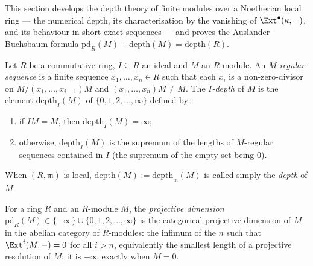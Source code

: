 This section develops the depth theory of finite modules over a Noetherian local ring
--- the numerical depth, its characterisation by the vanishing of
\(\Ext^{\bullet}(\kappa, -)\), and its behaviour in short exact sequences --- and proves
the Auslander--Buchsbaum formula
\(\mathrm{pd}_R(M) + \mathrm{depth}(M) = \mathrm{depth}(R)\).

\begin{definition}
  \label{def:depth}
  \leanok
  Let \(R\) be a commutative ring, \(I \subseteq R\) an ideal and \(M\) an \(R\)-module.
  An \emph{\(M\)-regular sequence} is a finite sequence \(x_1, \dots, x_n \in R\) such
  that each \(x_i\) is a non-zero-divisor on \(M/(x_1, \dots, x_{i-1})M\) and
  \((x_1, \dots, x_n)M \neq M\). The \emph{\(I\)-depth} of \(M\) is the element
  \(\mathrm{depth}_I(M)\) of \(\{0, 1, 2, \dots, \infty\}\) defined by:
  \begin{enumerate}
    \item if \(IM = M\), then \(\mathrm{depth}_I(M) = \infty\);
    \item otherwise, \(\mathrm{depth}_I(M)\) is the supremum of the lengths of
      \(M\)-regular sequences contained in \(I\) (the supremum of the empty set
      being \(0\)).
  \end{enumerate}
  When \((R, \mathfrak m)\) is local, \(\mathrm{depth}(M) := \mathrm{depth}_{\mathfrak m}(M)\)
  is called simply the \emph{depth} of \(M\).
\end{definition}

\begin{definition}
  \label{def:projectiveDimension}
  \leanok
  For a ring \(R\) and an \(R\)-module \(M\), the \emph{projective dimension}
  \(\mathrm{pd}_R(M) \in \{-\infty\} \cup \{0, 1, 2, \dots, \infty\}\) is the categorical
  projective dimension of \(M\) in the abelian category of \(R\)-modules: the infimum of
  the \(n\) such that \(\Ext^i(M, -) = 0\) for all \(i > n\), equivalently the smallest
  length of a projective resolution of \(M\); it is \(-\infty\) exactly when \(M = 0\).
\end{definition}

